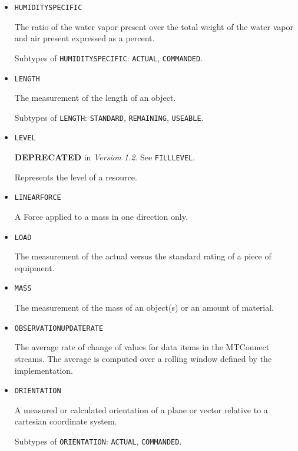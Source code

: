 \begin{itemize}
The amount of water vapor present expressed as a percent to reach saturation at the same temperature.

Subtypes of \texttt{HUMIDITY\textunderscore RELATIVE}: \texttt{COMMANDED}, \texttt{ACTUAL}.

\item \texttt{HUMIDITY\textunderscore SPECIFIC}  

The ratio of the water vapor present over the total weight of the water vapor and air present expressed as a percent.

Subtypes of \texttt{HUMIDITY\textunderscore SPECIFIC}: \texttt{ACTUAL}, \texttt{COMMANDED}.

\item \texttt{LENGTH}  

The measurement of the length of an object.

Subtypes of \texttt{LENGTH}: \texttt{STANDARD}, \texttt{REMAINING}, \texttt{USEABLE}.

\item \texttt{LEVEL}  

\textbf{DEPRECATED} in \textit{Version 1.2}.  See \texttt{FILL\textunderscore LEVEL}.

Represents the level of a resource.


\item \texttt{LINEAR\textunderscore FORCE}  

A \gls{Force} applied to a mass in one direction only.


\item \texttt{LOAD}  

The measurement of the actual versus the standard rating of a piece of equipment.


\item \texttt{MASS}  

The measurement of the mass of an object(s) or an amount of material.


\item \texttt{OBSERVATION\textunderscore UPDATE\textunderscore RATE}  

The average rate of change of values for data items in the MTConnect streams. The average is computed over a rolling window defined by the implementation.


\item \texttt{ORIENTATION}  

A measured or calculated orientation of a plane or vector relative to a cartesian coordinate system.

Subtypes of \texttt{ORIENTATION}: \texttt{ACTUAL}, \texttt{COMMANDED}.


\end{itemize}
